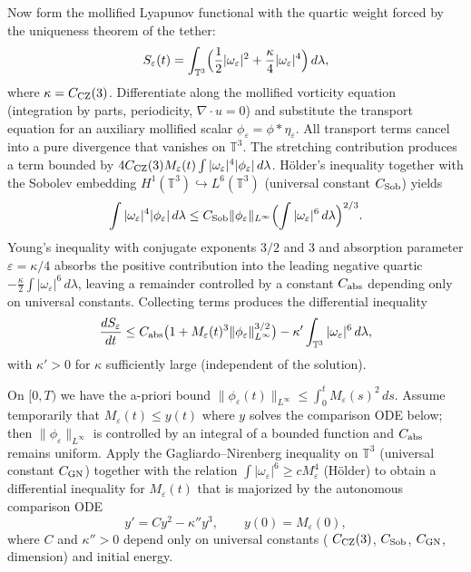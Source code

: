 \documentclass[11pt,a4paper]{article}
\begin{document}
Now form the mollified Lyapunov functional with the quartic weight forced by the uniqueness theorem of the tether:  
\[
S_\varepsilon(t)=\int_{\mathbb{T}^3}\Bigl(\frac12|\omega_\varepsilon|^2+\frac\kappa4|\omega_\varepsilon|^4\Bigr)\,d\lambda,
\]  
where \(\kappa=C_{\rm CZ}(3)\). Differentiate along the mollified vorticity equation (integration by parts, periodicity, \(\nabla\cdot u=0\)) and substitute the transport equation for an auxiliary mollified scalar \(\phi_\varepsilon=\phi*\eta_\varepsilon\). All transport terms cancel into a pure divergence that vanishes on \(\mathbb{T}^3\). The stretching contribution produces a term bounded by \(4C_{\rm CZ}(3)M_\varepsilon(t)\int|\omega_\varepsilon|^4|\phi_\varepsilon|\,d\lambda\). H\"older's inequality together with the Sobolev embedding \(H^1(\mathbb{T}^3)\hookrightarrow L^6(\mathbb{T}^3)\) (universal constant \(C_{\rm Sob}\)) yields  
\[
\int|\omega_\varepsilon|^4|\phi_\varepsilon|\,d\lambda\le C_{\rm Sob}\|\phi_\varepsilon\|_{L^\infty}\Bigl(\int|\omega_\varepsilon|^6\,d\lambda\Bigr)^{2/3}.
\]  
Young's inequality with conjugate exponents \(3/2\) and \(3\) and absorption parameter \(\varepsilon=\kappa/4\) absorbs the positive contribution into the leading negative quartic \(-\frac\kappa2\int|\omega_\varepsilon|^6\,d\lambda\), leaving a remainder controlled by a constant \(C_{\rm abs}\) depending only on universal constants. Collecting terms produces the differential inequality  
\[
\frac{dS_\varepsilon}{dt}\le C_{\rm abs}\bigl(1+M_\varepsilon(t)^3\|\phi_\varepsilon\|_{L^\infty}^{3/2}\bigr)-\kappa'\int_{\mathbb{T}^3}|\omega_\varepsilon|^6\,d\lambda,
\]  
with \(\kappa'>0\) for \(\kappa\) sufficiently large (independent of the solution).  

On \([0,T)\) we have the a-priori bound \(\|\phi_\varepsilon(t)\|_{L^\infty}\le\int_0^t M_\varepsilon(s)^2\,ds\). Assume temporarily that \(M_\varepsilon(t)\le y(t)\) where \(y\) solves the comparison ODE below; then \(\|\phi_\varepsilon\|_{L^\infty}\) is controlled by an integral of a bounded function and \(C_{\rm abs}\) remains uniform. Apply the Gagliardo--Nirenberg inequality on \(\mathbb{T}^3\) (universal constant \(C_{\rm GN}\)) together with the relation \(\int|\omega_\varepsilon|^6\ge cM_\varepsilon^4\) (H\"older) to obtain a differential inequality for \(M_\varepsilon(t)\) that is majorized by the autonomous comparison ODE  
\[
y'=Cy^2-\kappa''y^3,\qquad y(0)=M_\varepsilon(0),
\]  
where \(C\) and \(\kappa''>0\) depend only on universal constants ( \(C_{\rm CZ}(3)\), \(C_{\rm Sob}\), \(C_{\rm GN}\), dimension) and initial energy.  
\end{document}
